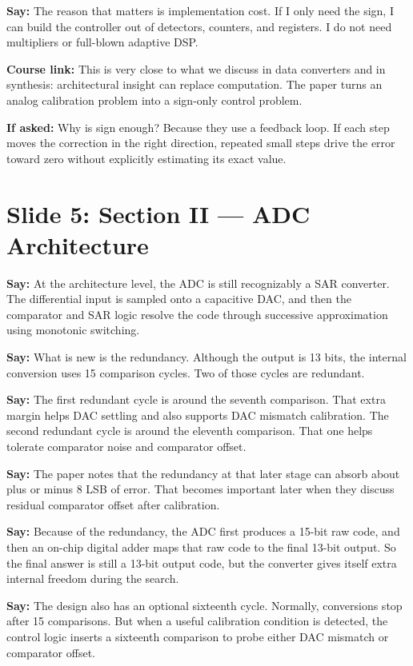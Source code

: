\documentclass[11pt]{article}
\newcommand{\speak}[1]{\textbf{Say:} #1}
\newcommand{\ifasked}[1]{\textbf{If asked:} #1}
\newcommand{\course}[1]{\textbf{Course link:} #1}
\begin{document}
\speak{The reason that matters is implementation cost. If I only need the sign, I can build the controller out of detectors, counters, and registers. I do not need multipliers or full-blown adaptive DSP.}

\course{This is very close to what we discuss in data converters and in synthesis: architectural insight can replace computation. The paper turns an analog calibration problem into a sign-only control problem.}

\ifasked{Why is sign enough? Because they use a feedback loop. If each step moves the correction in the right direction, repeated small steps drive the error toward zero without explicitly estimating its exact value.}

\section*{Slide 5: Section II --- ADC Architecture}
\speak{At the architecture level, the ADC is still recognizably a SAR converter. The differential input is sampled onto a capacitive DAC, and then the comparator and SAR logic resolve the code through successive approximation using monotonic switching.}

\speak{What is new is the redundancy. Although the output is 13 bits, the internal conversion uses 15 comparison cycles. Two of those cycles are redundant.}

\speak{The first redundant cycle is around the seventh comparison. That extra margin helps DAC settling and also supports DAC mismatch calibration. The second redundant cycle is around the eleventh comparison. That one helps tolerate comparator noise and comparator offset.}

\speak{The paper notes that the redundancy at that later stage can absorb about plus or minus 8 LSB of error. That becomes important later when they discuss residual comparator offset after calibration.}

\speak{Because of the redundancy, the ADC first produces a 15-bit raw code, and then an on-chip digital adder maps that raw code to the final 13-bit output. So the final answer is still a 13-bit output code, but the converter gives itself extra internal freedom during the search.}

\speak{The design also has an optional sixteenth cycle. Normally, conversions stop after 15 comparisons. But when a useful calibration condition is detected, the control logic inserts a sixteenth comparison to probe either DAC mismatch or comparator offset.}
\end{document}
